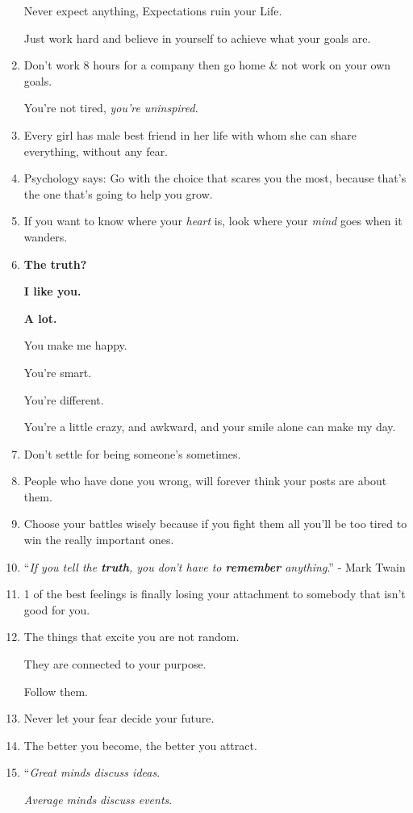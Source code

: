 \documentclass{article}
\begin{document}
\begin{enumerate}
	Never expect anything, Expectations ruin your Life.
	
	Just work hard and believe in yourself to achieve what your goals are.
	\item Don't work 8 hours for a company then go home \& not work on your own goals.
	
	You're not tired, \textit{you're uninspired}.
	\item Every girl has male best friend in her life with whom she can share everything, without any fear.
	\item Psychology says: Go with the choice that scares you the most, because that's the one that's going to help you grow.
	\item If you want to know where your \textit{heart} is, look where your \textit{mind} goes when it wanders.
	\item \textbf{The truth?}
	
	\textbf{I like you.}
	
	\textbf{A lot.}
	
	You make me happy.
	
	You're smart.
	
	You're different.
	
	You're a little crazy, and awkward, and your smile alone can make my day.
	\item Don't settle for being someone's sometimes.
	\item People who have done you wrong, will forever think your posts are about them.
	\item Choose your battles wisely because if you fight them all you'll be too tired to win the really important ones.
	\item ``\textit{If you tell the \textbf{truth}, you don't have to \textbf{remember} anything}.'' - Mark Twain
	\item 1 of the best feelings is finally losing your attachment to somebody that isn't good for you.
	\item The things that excite you are not random.
	
	They are connected to your purpose.
	
	Follow them.
	\item Never let your fear decide your future.
	\item The better you become, the better you attract.
	\item ``\textit{Great minds discuss ideas}.
	
	\textit{Average minds discuss events}.
	

\end{enumerate}
\end{document}
